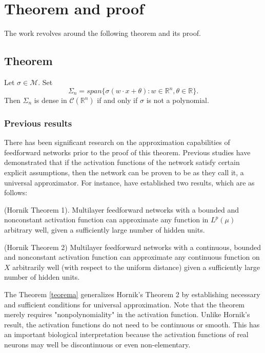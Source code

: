 \documentclass[../main.tex]{subfiles}
\begin{document}
	

	\chapter{Theorem and proof} \label{ch:proof}
\noindent  The work revolves around the following theorem and its proof. 
	\section{Theorem}
	\begin{theorem} Let $ \sigma \in  \mathcal{M}$. Set
		$$ \Sigma_n = span\{\sigma(w\cdot x + \theta) : w\in \mathbb{R}^n, \theta \in \mathbb{R} \}.$$
		Then $\Sigma_n$ is dense in $\mathcal{C}(\mathbb{R}^n)$ if and only if $\sigma$ is not a polynomial. 
	\label{teorema}
	\end{theorem}


\subsection{Previous results}
\noindent  There has been significant research on the approximation capabilities of feedforward networks prior to the proof of this theorem. Previous studies have demonstrated that if the activation functions of the network satisfy certain explicit assumptions, then the network can be proven to be as they call it, a universal approximator. For instance, \cite{HORNIK1991251} have established two results, which are as follows:

\begin{theorem} (Hornik Theorem 1). Multilayer feedforward networks with a bounded and nonconstant activation function can approximate any function in $L^p(\mu)$ arbitrary well, given a sufficiently large number of hidden units. 
\end{theorem}

\begin{theorem} (Hornik Theorem 2) Multilayer feedforward networks with a continuous, bounded and nonconstant activation function can approximate any continuous function on $X$ arbitrarily well (with respect to the uniform distance) given a sufficiently large number of hidden units. 
\end{theorem}

\noindent
The Theorem \ref{teorema} generalizes Hornik's Theorem 2 by establishing necessary and sufficient conditions for universal approximation. Note that the theorem merely requires "nonpolynomiality" in the activation function. Unlike Hornik's result, the activation functions do not need to be continuous or smooth. This has an important biological interpretation because the activation functions of real neurons may well be discontinuous or even non-elementary.
\end{document}
